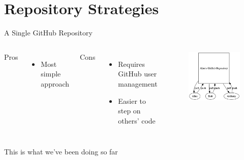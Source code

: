 \documentclass{beamer}
\begin{document}
    \section{Repository Strategies}\label{sec:repository-strategies}
    \begin{frame}{A Single GitHub Repository}
        \begin{columns}
            Pros
            \begin{itemize}
                \item Most simple approach
            \end{itemize}

            Cons
            \begin{itemize}
                \item Requires GitHub user management
                \item Easier to step on others' code
            \end{itemize}

            \begin{figure}
                \centering
                \includegraphics[width=\textwidth]{figures/single_repo.png}
            \end{figure}
        \end{columns}

        \centering
        This is what we've been doing so far
    \end{frame}
\end{document}
